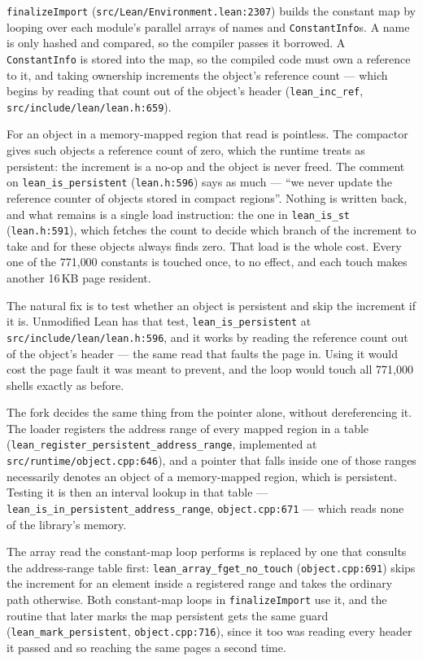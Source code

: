 \documentclass{article}
\newcommand{\Lean}{Lean\xspace}      %
\begin{document}
\texttt{finalizeImport} (\texttt{src/Lean/Environment.lean:2307}) builds the constant map by looping over each module's parallel arrays of names and \texttt{ConstantInfo}s. A name is only hashed and compared, so the compiler passes it borrowed. A \texttt{ConstantInfo} is stored into the map, so the compiled code must own a reference to it, and taking ownership increments the object's reference count --- which begins by reading that count out of the object's header (\texttt{lean\_inc\_ref}, \texttt{src/include/lean/lean.h:659}).

For an object in a memory-mapped region that read is pointless. The compactor gives such objects a reference count of zero, which the runtime treats as persistent: the increment is a no-op and the object is never freed. The comment on \texttt{lean\_is\_persistent} (\texttt{lean.h:596}) says as much --- ``we never update the reference counter of objects stored in compact regions''. Nothing is written back, and what remains is a single load instruction: the one in \texttt{lean\_is\_st} (\texttt{lean.h:591}), which fetches the count to decide which branch of the increment to take and for these objects always finds zero. That load is the whole cost. Every one of the 771{,}000 constants is touched once, to no effect, and each touch makes another 16\,KB page resident.

The natural fix is to test whether an object is persistent and skip the increment if it is. Unmodified \Lean has that test, \texttt{lean\_is\_persistent} at \texttt{src/include/lean/lean.h:596}, and it works by reading the reference count out of the object's header --- the same read that faults the page in. Using it would cost the page fault it was meant to prevent, and the loop would touch all 771{,}000 shells exactly as before.

The fork decides the same thing from the pointer alone, without dereferencing it. The loader registers the address range of every mapped region in a table (\texttt{lean\_register\_persistent\_address\_range}, implemented at \texttt{src/runtime/object.cpp:646}), and a pointer that falls inside one of those ranges necessarily denotes an object of a memory-mapped region, which is persistent. Testing it is then an interval lookup in that table --- \texttt{lean\_is\_in\_\allowbreak persistent\_\allowbreak address\_\allowbreak range}, \texttt{object.cpp:671} --- which reads none of the library's memory.

The array read the constant-map loop performs is replaced by one that consults the address-range table first: \texttt{lean\_array\_\allowbreak fget\_\allowbreak no\_touch} (\texttt{object.cpp:691}) skips the increment for an element inside a registered range and takes the ordinary path otherwise. Both constant-map loops in \texttt{finalizeImport} use it, and the routine that later marks the map persistent gets the same guard (\texttt{lean\_mark\_persistent}, \texttt{object.cpp:716}), since it too was reading every header it passed and so reaching the same pages a second time.
\end{document}
